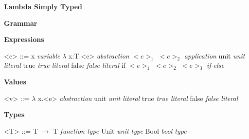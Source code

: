 \documentclass[11pt,oneside]{book}
\newcommand{\synlabel}[1]{\hfill \textit{#1}}
\begin{document}
\frontmatter

\mainmatter

\pagebreak

\begin{center}
    {
        \bf
        \huge
        Lambda Simply Typed
    }
\end{center}

\begin{center}
{
    \bf
    \huge
    Grammar
}
\end{center}


\setlength{\grammarindent}{10em} %

\setlength{\grammarparsep}{5pt} %

\textbf{Expressions}

\begin{grammar}

    <e> ::=  x                            \synlabel{variable}
        \alt $\lambda$ x:T.<e>            \synlabel{abstraction}
        \alt $<e>_1$ $<e>_2$              \synlabel{application}
        \alt unit                         \synlabel{unit literal}
        \alt true                         \synlabel{true literal}
        \alt false                        \synlabel{false literal}
        \alt if $<e>_1$ $<e>_2$ $<e>_3$   \synlabel{if-else}

\end{grammar}

\textbf{Values}

\begin{grammar}

    <v> ::=  $\lambda$ x.<e>            \synlabel{abstraction}
        \alt unit                       \synlabel{unit literal}
        \alt true                       \synlabel{true literal}
        \alt false                      \synlabel{false literal}

\end{grammar}

\textbf{Types}

\begin{grammar}

    <T> ::= T $\rightarrow$ T         \synlabel{function type}
        \alt Unit                     \synlabel{unit type}
        \alt Bool                     \synlabel{bool type}

\end{grammar}
\end{document}
